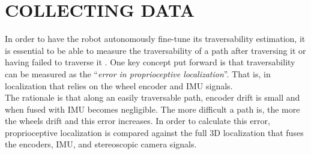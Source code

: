 \documentclass[12pt,a4paper,table,dvipsnames,tikz]{report}
\newcommand{\defn}[1]{\enquote{\textit{#1}}}
\newcommand{\acronym}{\MakeUppercase}
\begin{document}
	
	\chapter{COLLECTING DATA}
	\label{app:data}
	
	In order to have the robot autonomously fine-tune its traversability estimation, 
	it is essential to be able to measure the traversability of a path after traversing it 
	or having failed to traverse it \citep{Katerina}. One key concept put forward is 
	that traversability can be measured as the \defn{error in proprioceptive localization}. 
	That is, in localization that relies on the wheel encoder and \acronym{imu} signals.
	\\
	
	The rationale is that along an easily traversable path, encoder drift is small and 
	when fused with \acronym{imu} becomes negligible. The more difficult a path is, the 
	more the wheels drift and this error increases. In order to calculate this error, 
	proprioceptive localization is compared against the full \acronym{3d} localization that
	fuses the encoders, \acronym{imu}, and stereoscopic camera signals.
	\\
	
\end{document}
